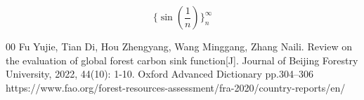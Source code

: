 \documentclass[12pt]{article}
\begin{document}
\begin{equation}
	\{\sin(\frac{1}{n})\}_n^{\infty}
\end{equation}















\newpage
\begin{thebibliography}{00}
Fu Yujie, Tian Di, Hou Zhengyang, Wang Minggang, Zhang Naili. Review on the evaluation of global forest carbon sink function[J]. Journal of Beijing Forestry University, 2022, 44(10): 1-10.
Oxford Advanced Dictionary pp.304--306 
https://www.fao.org/forest-resources-assessment/fra-2020/country-reports/en/
\end{thebibliography}
\end{document}
